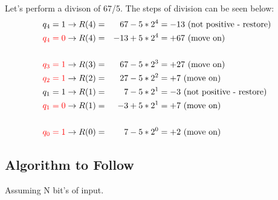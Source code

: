 \documentclass{article}
\begin{document}
Let's perform a divison of 67/5.
The steps of division can be seen below:
\begin{align*}
    q_4 = 1                  & \rightarrow R(4) = & 67 - 5 * 2^4  & = -13 \text{ (not positive - restore)} \\
    \textcolor{red}{q_4 = 0} & \rightarrow R(4) = & -13 + 5 * 2^4 & = +67 \text{ (move on)}                \\
    \\
    \textcolor{red}{q_3 = 1} & \rightarrow R(3) = & 67 - 5 * 2^3  & = +27 \text{ (move on)}                \\
    \textcolor{red}{q_2 = 1} & \rightarrow R(2) = & 27 - 5 * 2^2  & = +7 \text{ (move on)}                 \\
    q_1 = 1                  & \rightarrow R(1) = & 7 - 5 * 2^1   & = -3 \text{ (not positive - restore)}  \\
    \textcolor{red}{q_1 = 0} & \rightarrow R(1) = & -3 + 5 * 2^1  & = +7 \text{ (move on)}                 \\
    \\
    \textcolor{red}{q_0 = 1} & \rightarrow R(0) = & 7 - 5 * 2^0   & = +2 \text{ (move on)}                 \\
\end{align*}

\subsection{Algorithm to Follow}
Assuming N bit's of input.
\end{document}
